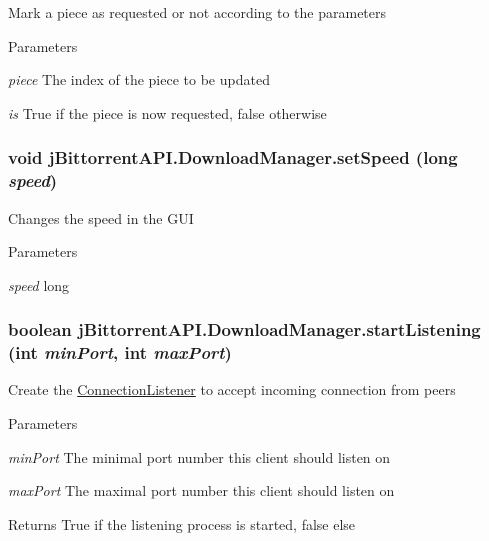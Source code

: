 \label{classj_bittorrent_a_p_i_1_1_download_manager_a25c9eae498059d4de7b7642e5cd30498}
Mark a piece as requested or not according to the parameters 
\begin{DoxyParams}{Parameters}
\item[{\em piece}]The index of the piece to be updated \item[{\em is}]True if the piece is now requested, false otherwise \end{DoxyParams}
\hypertarget{classj_bittorrent_a_p_i_1_1_download_manager_a2ddf8d8a8c0c6e862cc861aded87e0a2}{
\subsubsection[{setSpeed}]{\setlength{\rightskip}{0pt plus 5cm}void jBittorrentAPI.DownloadManager.setSpeed (long {\em speed})}}
\label{classj_bittorrent_a_p_i_1_1_download_manager_a2ddf8d8a8c0c6e862cc861aded87e0a2}
Changes the speed in the GUI 
\begin{DoxyParams}{Parameters}
\item[{\em speed}]long \end{DoxyParams}
\hypertarget{classj_bittorrent_a_p_i_1_1_download_manager_aef5ce5f1d5f07d30b00f18d52b52c0ec}{
\subsubsection[{startListening}]{\setlength{\rightskip}{0pt plus 5cm}boolean jBittorrentAPI.DownloadManager.startListening (int {\em minPort}, \/  int {\em maxPort})}}
\label{classj_bittorrent_a_p_i_1_1_download_manager_aef5ce5f1d5f07d30b00f18d52b52c0ec}
Create the \hyperlink{classj_bittorrent_a_p_i_1_1_connection_listener}{ConnectionListener} to accept incoming connection from peers 
\begin{DoxyParams}{Parameters}
\item[{\em minPort}]The minimal port number this client should listen on \item[{\em maxPort}]The maximal port number this client should listen on \end{DoxyParams}
\begin{DoxyReturn}{Returns}
True if the listening process is started, false else 
\end{DoxyReturn}

